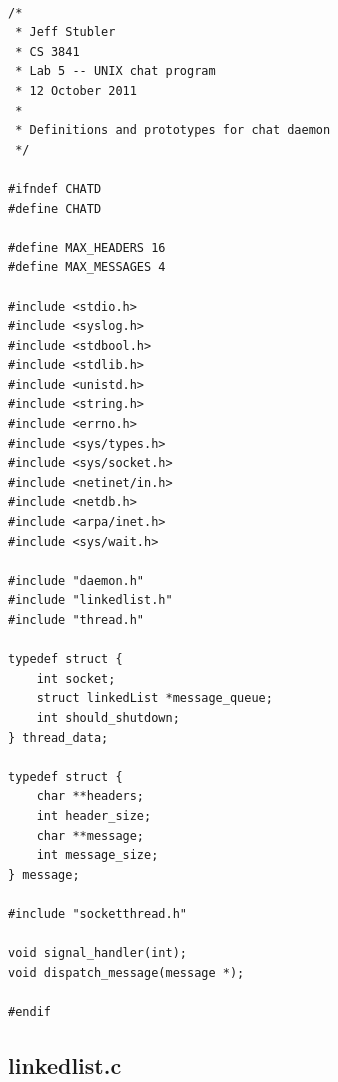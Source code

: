 \documentclass{article}
\begin{document}
\begin{verbatim}

/*
 * Jeff Stubler
 * CS 3841
 * Lab 5 -- UNIX chat program
 * 12 October 2011
 *
 * Definitions and prototypes for chat daemon
 */

#ifndef CHATD
#define CHATD

#define MAX_HEADERS 16
#define MAX_MESSAGES 4

#include <stdio.h>
#include <syslog.h>
#include <stdbool.h>
#include <stdlib.h>
#include <unistd.h>
#include <string.h>
#include <errno.h>
#include <sys/types.h>
#include <sys/socket.h>
#include <netinet/in.h>
#include <netdb.h>
#include <arpa/inet.h>
#include <sys/wait.h>

#include "daemon.h"
#include "linkedlist.h"
#include "thread.h"

typedef struct {
    int socket;
    struct linkedList *message_queue;
    int should_shutdown;
} thread_data;

typedef struct {
    char **headers;
    int header_size;
    char **message;
    int message_size;
} message;

#include "socketthread.h"

void signal_handler(int);
void dispatch_message(message *);

#endif

\end{verbatim}

\subsection*{linkedlist.c}
\end{document}
